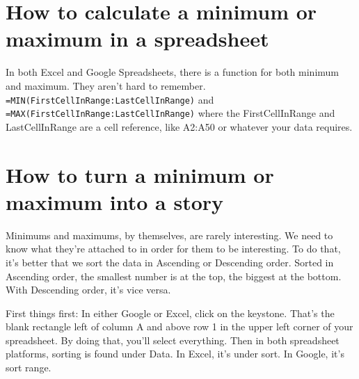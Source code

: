 \documentclass[]{book}
\begin{document}
\hypertarget{how-to-calculate-a-minimum-or-maximum-in-a-spreadsheet}{%
\section{How to calculate a minimum or maximum in a spreadsheet}\label{how-to-calculate-a-minimum-or-maximum-in-a-spreadsheet}}

In both Excel and Google Spreadsheets, there is a function for both minimum and maximum. They aren't hard to remember. \texttt{=MIN(FirstCellInRange:LastCellInRange)} and \texttt{=MAX(FirstCellInRange:LastCellInRange)} where the FirstCellInRange and LastCellInRange are a cell reference, like A2:A50 or whatever your data requires.

\hypertarget{how-to-turn-a-minimum-or-maximum-into-a-story}{%
\section{How to turn a minimum or maximum into a story}\label{how-to-turn-a-minimum-or-maximum-into-a-story}}

Minimums and maximums, by themselves, are rarely interesting. We need to know what they're attached to in order for them to be interesting. To do that, it's better that we sort the data in Ascending or Descending order. Sorted in Ascending order, the smallest number is at the top, the biggest at the bottom. With Descending order, it's vice versa.

First things first: In either Google or Excel, click on the keystone. That's the blank rectangle left of column A and above row 1 in the upper left corner of your spreadsheet. By doing that, you'll select everything. Then in both spreadsheet platforms, sorting is found under Data. In Excel, it's under sort. In Google, it's sort range.
\end{document}
